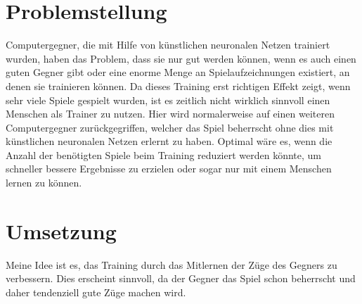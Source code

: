 \section{Problemstellung}

Computergegner, die mit Hilfe von künstlichen neuronalen Netzen trainiert wurden, haben das Problem, dass sie nur gut werden können, wenn es auch einen guten Gegner gibt oder eine enorme Menge an Spielaufzeichnungen existiert, an denen sie trainieren können. Da dieses Training erst richtigen Effekt zeigt, wenn sehr viele Spiele gespielt wurden, ist es zeitlich nicht wirklich sinnvoll einen Menschen als Trainer zu nutzen. Hier wird normalerweise auf einen weiteren Computergegner zurückgegriffen, welcher das Spiel beherrscht ohne dies mit künstlichen neuronalen Netzen erlernt zu haben. Optimal wäre es, wenn die Anzahl der benötigten Spiele beim Training reduziert werden könnte, um schneller bessere Ergebnisse zu erzielen oder sogar nur mit einem Menschen lernen zu können.




\section{Umsetzung}

Meine Idee ist es, das Training durch das Mitlernen der Züge des Gegners zu verbessern. Dies erscheint sinnvoll, da der Gegner das Spiel schon beherrscht und daher tendenziell gute Züge machen wird. 














